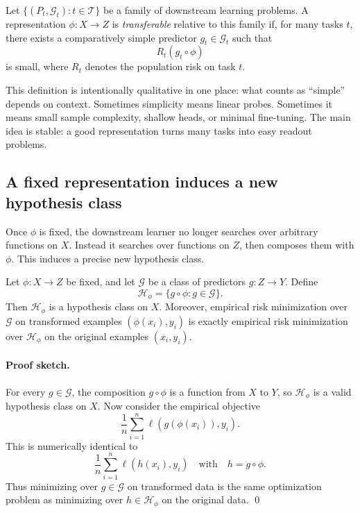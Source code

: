 \begin{definition}
Let \(\{(P_t,\mathcal{G}_t): t \in \mathcal{T}\}\) be a family of downstream learning problems.
A representation \(\phi : X \to Z\) is \emph{transferable} relative to this family if, for many tasks \(t\), there exists a comparatively simple predictor \(g_t \in \mathcal{G}_t\) such that
\[
R_t(g_t \circ \phi)
\]
is small, where \(R_t\) denotes the population risk on task \(t\).
\end{definition}

This definition is intentionally qualitative in one place: what counts as ``simple'' depends on context.
Sometimes simplicity means linear probes.
Sometimes it means small sample complexity, shallow heads, or minimal fine-tuning.
The main idea is stable: a good representation turns many tasks into easy readout problems.

\subsection*{A fixed representation induces a new hypothesis class}

Once \(\phi\) is fixed, the downstream learner no longer searches over arbitrary functions on \(X\).
Instead it searches over functions on \(Z\), then composes them with \(\phi\).
This induces a precise new hypothesis class.

\begin{proposition}
Let \(\phi : X \to Z\) be fixed, and let \(\mathcal{G}\) be a class of predictors \(g : Z \to Y\).
Define
\[
\mathcal{H}_{\phi}
=
\{g \circ \phi : g \in \mathcal{G}\}.
\]
Then \(\mathcal{H}_{\phi}\) is a hypothesis class on \(X\).
Moreover, empirical risk minimization over \(\mathcal{G}\) on transformed examples \((\phi(x_i),y_i)\) is exactly empirical risk minimization over \(\mathcal{H}_{\phi}\) on the original examples \((x_i,y_i)\).
\end{proposition}

\paragraph{Proof sketch.}
For every \(g \in \mathcal{G}\), the composition \(g \circ \phi\) is a function from \(X\) to \(Y\), so \(\mathcal{H}_{\phi}\) is a valid hypothesis class on \(X\).
Now consider the empirical objective
\[
\frac{1}{n}\sum_{i=1}^n \ell(g(\phi(x_i)),y_i).
\]
This is numerically identical to
\[
\frac{1}{n}\sum_{i=1}^n \ell(h(x_i),y_i)
\quad\text{with}\quad h = g \circ \phi.
\]
Thus minimizing over \(g \in \mathcal{G}\) on transformed data is the same optimization problem as minimizing over \(h \in \mathcal{H}_{\phi}\) on the original data.
\qed

